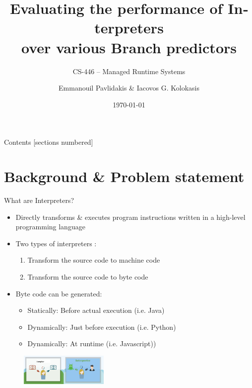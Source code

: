\documentclass[10pt]{beamer}
\title{\textlatin{Evaluating the performance of Interpreters\\over various Branch predictors}}
\subtitle{CS-446 -- Managed Runtime Systems}
\date{\today}
\author{Emmanouil Pavlidakis \& Iacovos G. Kolokasis}
\institute{Computer Science Department \\ University Of Crete}
\begin{document}
{
\maketitle
}

{
\begin{frame}{Contents}
  [sections numbered]
  \tableofcontents[hideallsubsections]
\end{frame}
}

\section{Background \& Problem statement}

\begin{frame}{What are Interpreters?}
    \begin{itemize}
    	\item {Directly transforms \& executes program instructions written in a high-level programming language} 
    	\item {Two types of interpreters : }
    	\begin{enumerate}
    		\item {Transform the source code to machine code}
    		\item {Transform the source code to byte code}
    	\end{enumerate}	
        \item {Byte code can be generated: }
	         \begin{itemize}
	         	\item{Statically: Before actual execution (i.e. Java)}
	         	\item{Dynamically: Just before execution (i.e. Python)}
	         	\item{Dynamically: At runtime (i.e. Javascript))}
	         \end{itemize}
    \end{itemize}
    \begin{figure}
	    \includegraphics[height=1.5cm]{figures/interVSComp.jpg}
    \end{figure}
\end{frame}
\end{document}
